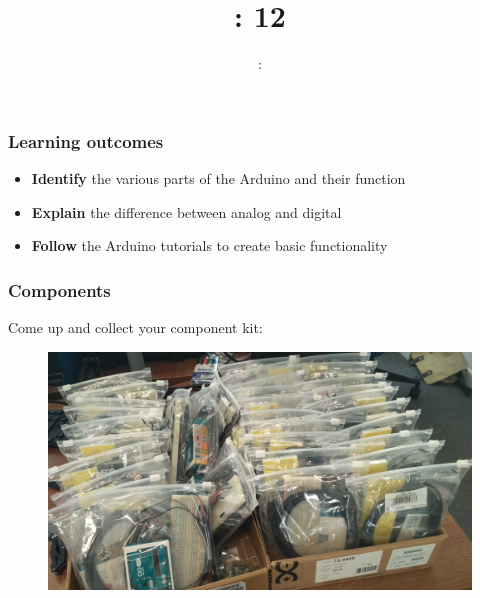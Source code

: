 \usepackage{../../beamerthemeFalmouthGamesAcademy}
\usepackage{multimedia}
\graphicspath{ {../../} }


\usepackage[normalem]{ulem}
\usepackage{wasysym}
\usepackage{listings}
\usepackage{pdfpages}

\usetikzlibrary{arrows,automata}




\title{\sessionnumber: 12}
\subtitle{\modulecode: \moduletitle}

\frame{\titlepage}

\begin{frame}
	\frametitle{Learning outcomes}
	\begin{itemize}
		\item \textbf{Identify} the various parts of the Arduino and their function
		\item \textbf{Explain} the difference between analog and digital
		\item \textbf{Follow} the Arduino tutorials to create basic functionality
	\end{itemize}
\end{frame}

\begin{frame}
	\frametitle{Components}
	Come up and collect your component kit:
	\begin{figure}
		\includegraphics[scale=.2]{assets/kit}  
	\end{figure}
\end{frame}


